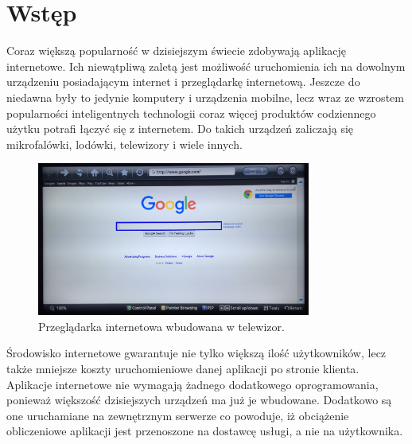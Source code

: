 {\let\cleardoublepage\relax \chapter{Wstęp}}
\label{cha:wstep}





Coraz większą popularność w dzisiejszym świecie zdobywają aplikację internetowe. Ich niewątpliwą zaletą jest możliwość uruchomienia ich na dowolnym urządzeniu posiadającym internet i przeglądarkę internetową. Jeszcze do niedawna były to jedynie komputery i urządzenia mobilne, lecz wraz ze wzrostem popularności inteligentnych technologii coraz więcej produktów codziennego użytku potrafi łączyć się z internetem. Do takich urządzeń zaliczają się mikrofalówki, lodówki, telewizory i wiele innych.

\begin{figure}[h]
	\centering
	\includegraphics[height=50.5mm]{images/Browser.jpg}
	 \caption{Przeglądarka internetowa wbudowana w telewizor.}
\end{figure}


Środowisko internetowe gwarantuje nie tylko większą ilość użytkowników, lecz także mniejsze koszty uruchomieniowe danej aplikacji po stronie klienta. Aplikacje internetowe nie wymagają żadnego dodatkowego oprogramowania, ponieważ większość dzisiejszych urządzeń ma już je wbudowane. Dodatkowo są one uruchamiane na zewnętrznym serwerze co powoduje, iż obciążenie obliczeniowe aplikacji jest przenoszone na dostawcę usługi, a nie na użytkownika. 

